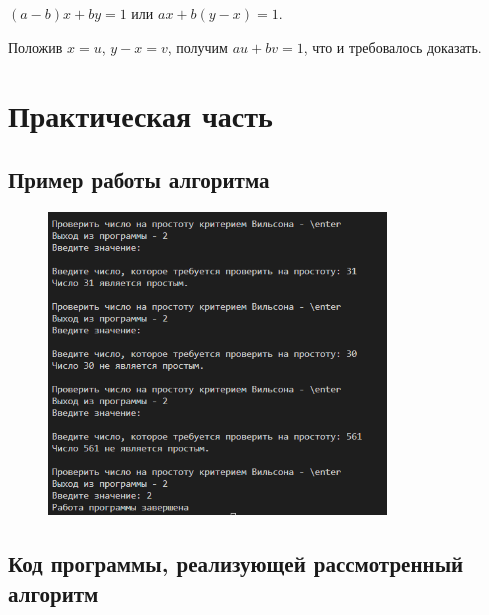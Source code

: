 \documentclass[bachelor, och, labwork]{shiza}
\begin{document}
\begin{center}
    $(a-b)x+by=1$ или $ax+b(y-x)=1$.
\end{center}

Положив $x=u$, $y-x=v$, получим $au + bv = 1$, что и требовалось доказать.


\section{Практическая часть}
\subsection{Пример работы алгоритма}
\begin{figure}[H]
    \centering
    \includegraphics[width=0.8\textwidth]{pic1.png}
    \caption{}
\end{figure}

    \subsection{Код программы, реализующей рассмотренный алгоритм}
        \inputminted{python}{lab3.py}
\end{document}

